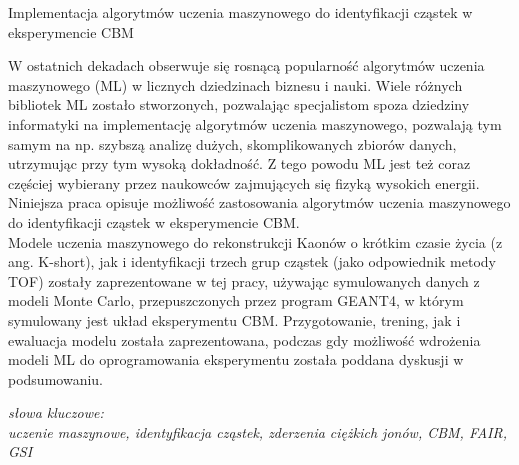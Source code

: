 \begin{description}[leftmargin=2.2cm,font=\normalfont]
\item[Tytuł pracy:]  Implementacja algorytmów uczenia maszynowego do identyfikacji cząstek w eksperymencie CBM
\end{description}

W ostatnich dekadach obserwuje się rosnącą popularność algorytmów uczenia maszynowego (ML) w licznych dziedzinach biznesu i nauki.
Wiele różnych bibliotek ML zostało stworzonych, pozwalając specjalistom spoza dziedziny informatyki na implementację algorytmów uczenia maszynowego, pozwalają tym samym na np. szybszą analizę dużych, skomplikowanych zbiorów danych, utrzymując przy tym wysoką dokładność.
Z tego powodu ML jest też coraz częściej wybierany przez naukowców zajmujących się fizyką wysokich energii.
Niniejsza praca opisuje możliwość zastosowania algorytmów uczenia maszynowego do identyfikacji cząstek w eksperymencie CBM.\\

Modele uczenia maszynowego do rekonstrukcji Kaonów o krótkim czasie życia (z ang. K-short), jak i identyfikacji trzech grup cząstek (jako odpowiednik metody TOF) zostały zaprezentowane w tej pracy, używając symulowanych danych z modeli Monte Carlo, przepuszczonych przez program GEANT4, w którym symulowany jest układ eksperymentu CBM.
Przygotowanie, trening, jak i ewaluacja modelu została zaprezentowana, podczas gdy możliwość wdrożenia modeli ML do oprogramowania eksperymentu została poddana dyskusji w podsumowaniu.


\vspace{0.025\textheight}
\textit{słowa kluczowe:}\\
\textit{uczenie maszynowe, identyfikacja cząstek, zderzenia ciężkich jonów, CBM, FAIR, GSI}